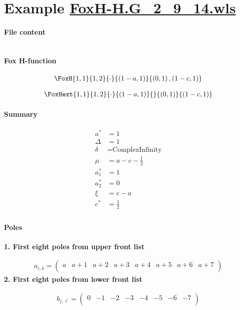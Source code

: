 \documentclass[11pt]{article}
\begin{document}
\section{Example \url{FoxH-H.G_2_9_14.wls}}

\paragraph{File content}

\inputminted{text}{FoxH-H.G_2_9_14.wls}

\paragraph{Fox H-function}

\begin{align*}
  \FoxH
    {1,1}
    {1,2}
    {\cdot}
    {\left(1-a, 1\right)}
    {\left(0, 1\right), \left(1-c, 1\right)}
\end{align*}

\begin{align*}
  \FoxHext
    {1,1}
    {1,2}
    {\cdot}
    {\left(1-a, 1\right)}
    {}
    {\left(0, 1\right)}
    {\left(1-c, 1\right)}
\end{align*}

\paragraph{Summary}

\begin{align*}
  a^*    & = 1 \\
  \Delta & = 1 \\
  \delta & = \text{ComplexInfinity} \\
  \mu    & = a-c-\frac{1}{2} \\
  a_1^*  & = 1 \\
  a_2^*  & = 0 \\
  \xi    & = c-a \\
  c^*    & = \frac{1}{2} \\
\end{align*}

\paragraph{Poles}

\noindent\textbf{1. First eight poles from upper front list}

\begin{align*}
  a_{i,k} = 
  \left(
\begin{array}{cccccccc}
 a & a+1 & a+2 & a+3 & a+4 & a+5 & a+6 & a+7 \\
\end{array}
\right)
\end{align*}
\noindent\textbf{2. First eight poles from lower front list}

\begin{align*}
  b_{j,\ell} = 
  \left(
\begin{array}{cccccccc}
 0 & -1 & -2 & -3 & -4 & -5 & -6 & -7 \\
\end{array}
\right)
\end{align*}



\printbibliography[title={References}]
\end{document}

